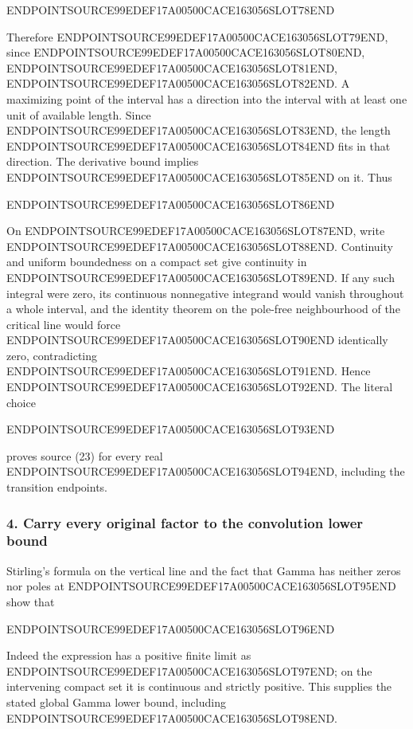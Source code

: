 ENDPOINTSOURCE99EDEF17A00500CACE163056SLOT78END

Therefore ENDPOINTSOURCE99EDEF17A00500CACE163056SLOT79END, since ENDPOINTSOURCE99EDEF17A00500CACE163056SLOT80END, ENDPOINTSOURCE99EDEF17A00500CACE163056SLOT81END, ENDPOINTSOURCE99EDEF17A00500CACE163056SLOT82END. A maximizing point of the interval has a direction into the interval with at least one unit of available length. Since ENDPOINTSOURCE99EDEF17A00500CACE163056SLOT83END, the length ENDPOINTSOURCE99EDEF17A00500CACE163056SLOT84END fits in that direction. The derivative bound implies ENDPOINTSOURCE99EDEF17A00500CACE163056SLOT85END on it. Thus

ENDPOINTSOURCE99EDEF17A00500CACE163056SLOT86END

On ENDPOINTSOURCE99EDEF17A00500CACE163056SLOT87END, write ENDPOINTSOURCE99EDEF17A00500CACE163056SLOT88END. Continuity and uniform boundedness on a compact set give continuity in ENDPOINTSOURCE99EDEF17A00500CACE163056SLOT89END. If any such integral were zero, its continuous nonnegative integrand would vanish throughout a whole interval, and the identity theorem on the pole-free neighbourhood of the critical line would force ENDPOINTSOURCE99EDEF17A00500CACE163056SLOT90END identically zero, contradicting ENDPOINTSOURCE99EDEF17A00500CACE163056SLOT91END. Hence ENDPOINTSOURCE99EDEF17A00500CACE163056SLOT92END. The literal choice

ENDPOINTSOURCE99EDEF17A00500CACE163056SLOT93END

proves source (23) for every real ENDPOINTSOURCE99EDEF17A00500CACE163056SLOT94END, including the transition endpoints.

\subsubsection{4. Carry every original factor to the convolution lower bound}\label{endpoint-arithmetic_intake--carry-every-original-factor-to-the-convolution-lower-bound}

Stirling's formula on the vertical line and the fact that Gamma has neither zeros nor poles at ENDPOINTSOURCE99EDEF17A00500CACE163056SLOT95END show that

ENDPOINTSOURCE99EDEF17A00500CACE163056SLOT96END

Indeed the expression has a positive finite limit as ENDPOINTSOURCE99EDEF17A00500CACE163056SLOT97END; on the intervening compact set it is continuous and strictly positive. This supplies the stated global Gamma lower bound, including ENDPOINTSOURCE99EDEF17A00500CACE163056SLOT98END.

